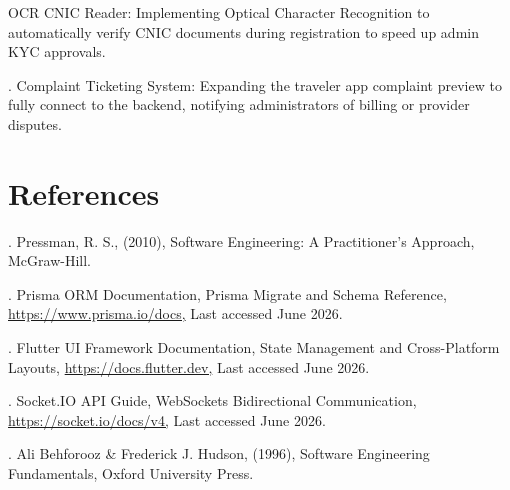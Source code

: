 \documentclass[12pt,a4paper]{article}
\newlength{\ThesisParagraphIndent}
\newcommand{\ThesisParagraph}[1]{%
  \par\begingroup
  \setlength{\leftskip}{\ThesisParagraphIndent}%
  \setlength{\parindent}{0pt}%
  \noindent#1\par
  \endgroup}
\begin{document}
\begin{list}{}{\setlength{\leftmargin}{\dimexpr\ThesisParagraphIndent+1.5em\relax}\setlength{\labelsep}{0.5em}\setlength{\topsep}{2pt}\setlength{\parsep}{0pt}}
\item[3.] OCR CNIC Reader: Implementing Optical Character Recognition to automatically verify CNIC documents during registration to speed up admin KYC approvals.
\end{list}


\ThesisParagraph{4. Complaint Ticketing System: Expanding the traveler app complaint preview to fully connect to the backend, notifying administrators of billing or provider disputes.}


\section{References}

\ThesisParagraph{1. Pressman, R. S., (2010), Software Engineering: A Practitioner's Approach, McGraw-Hill.}


\ThesisParagraph{2. Prisma ORM Documentation, Prisma Migrate and Schema Reference, \url{https://www.prisma.io/docs,} Last accessed June 2026.}


\ThesisParagraph{3. Flutter UI Framework Documentation, State Management and Cross-Platform Layouts, \url{https://docs.flutter.dev,} Last accessed June 2026.}


\ThesisParagraph{4. Socket.IO API Guide, WebSockets Bidirectional Communication, \url{https://socket.io/docs/v4,} Last accessed June 2026.}


\ThesisParagraph{5. Ali Behforooz \& Frederick J. Hudson, (1996), Software Engineering Fundamentals, Oxford University Press.}


\clearpage


\end{document}
